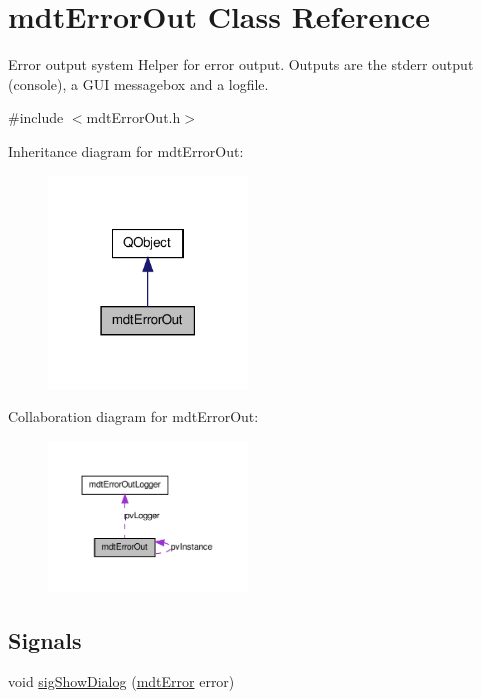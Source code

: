 \hypertarget{classmdt_error_out}{\section{mdt\-Error\-Out Class Reference}
\label{classmdt_error_out}
}


Error output system Helper for error output. Outputs are the stderr output (console), a G\-U\-I messagebox and a logfile.  




{\ttfamily \#include $<$mdt\-Error\-Out.\-h$>$}



Inheritance diagram for mdt\-Error\-Out\-:\nopagebreak
\begin{figure}[H]
\begin{center}
\leavevmode
\includegraphics[width=150pt]{classmdt_error_out__inherit__graph}
\end{center}
\end{figure}


Collaboration diagram for mdt\-Error\-Out\-:\nopagebreak
\begin{figure}[H]
\begin{center}
\leavevmode
\includegraphics[width=150pt]{classmdt_error_out__coll__graph}
\end{center}
\end{figure}
\subsection*{Signals}
\begin{DoxyCompactItemize}
\item 
void \hyperlink{classmdt_error_out_a033747841ec3340f0396e574723095d7}{sig\-Show\-Dialog} (\hyperlink{classmdt_error}{mdt\-Error} error)
\end{DoxyCompactItemize}
